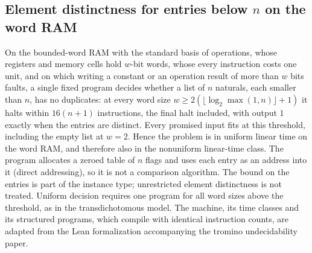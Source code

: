 \begin{result}
\subsection{Element distinctness for entries below \texorpdfstring{$n$}{n} on the word RAM}
On the bounded-word RAM with the standard basis of operations, whose registers and memory cells
hold $w$-bit words, whose every instruction costs one unit, and on which writing a constant or an
operation result of more than $w$ bits faults, a single fixed program decides whether a list of $n$ naturals, each smaller than
$n$, has no duplicates: at every word size
$w\ge 2(\lfloor\log_2\max(1,n)\rfloor+1)$ it halts within
$16(n+1)$ instructions, the final halt included, with output $1$ exactly when the entries are
distinct. Every promised input fits at this threshold, including the empty list at $w=2$.
Hence the problem is in uniform linear time on the word RAM, and therefore also in the
nonuniform linear-time class. The program allocates a zeroed
table of $n$ flags and uses each entry as an address into it (direct addressing), so it is not a
comparison algorithm. The bound on the entries is part of the instance type; unrestricted element
distinctness is not treated. Uniform decision requires one program for all word sizes above the
threshold, as in the transdichotomous model. The machine, its time classes and its structured
programs, which compile with identical instruction counts, are adapted from the Lean
formalization accompanying the tromino undecidability paper.
\citep[Sections 2.2 and 11.1]{CLRS2009}\citep{FredmanWillard1993,Hagerup1998}\citep{Tromino2025}
\end{result}

